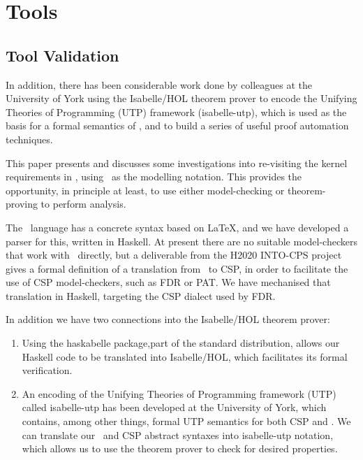 \section{Tools}

\subsection{Tool Validation}

In addition, there has been considerable work done by colleagues at
the University of York using the Isabelle/HOL theorem prover\cite{NPW02}
to encode the Unifying Theories of Programming (UTP) framework (\textsf{isabelle-utp}),
which is used as the basis for a formal semantics of \Circus,
and to build a series of useful proof automation techniques\cite{FosterZW14}.

This paper presents and discusses some investigations
into re-visiting the kernel requirements in \cite{IMAKQP-D02},
using \Circus\ as the modelling notation.
This provides the opportunity, in principle at least,
to use either model-checking or theorem-proving to perform analysis.



The \Circus\ language has a concrete syntax based on \LaTeX,
and we have developed a parser for this, written in Haskell.
At present there are no suitable model-checkers
that work with \Circus\ directly,
but a deliverable from the H2020 INTO-CPS project\cite{compassd241}
gives a formal definition
of a translation from \Circus\ to CSP,
in order to facilitate the use of CSP model-checkers,
such as FDR\cite{FDR3} or PAT\cite{SunLDP09}.
We have mechanised that translation in Haskell,
targeting the CSP dialect used by FDR.

In addition we have two connections into
the Isabelle/HOL theorem prover:
\begin{enumerate}
  \item
    Using the \textsf{haskabelle} package,part of the standard distribution,
    allows our Haskell code to be translated into Isabelle/HOL,
    which facilitates its formal verification.
  \item
    An encoding of
    the Unifying Theories of Programming framework (UTP)
    called \textsf{isabelle-utp} has been developed
    at the University of York\cite{FosterZW14},
    which contains, among other things, formal UTP semantics for both CSP and
    \Circus.
    We can translate our \Circus\ and CSP abstract syntaxes into
    \textsf{isabelle-utp} notation,
    which allows us to use the theorem prover to check for desired properties.
\end{enumerate}

